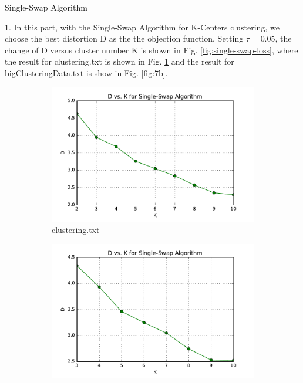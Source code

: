 \begin{description}
\begin{description}
\end{description}


\item[(\Romannum{3}).] Single-Swap Algorithm

\begin{description}
\item{1.} In this part, with the Single-Swap Algorithm for K-Centers clustering, we choose the best distortion D as the the objection function. Setting $\tau = 0.05$, the change of D versus cluster number K is shown in Fig. \ref{fig:single-swap-loss}, where the result for clustering.txt is shown in Fig. \ref{fig:7a} and the result for bigClusteringData.txt is show in Fig. \ref{fig:7b}.

\begin{figure}[H]
\centering
\centering
        \begin{subfigure}[b]{0.49\textwidth}
            \centering
            \includegraphics[width=\textwidth]{./figures/loss_clustering_singleSwap.pdf}
            \caption{clustering.txt}\label{fig:7a}
        \end{subfigure}
        \hfill
        \begin{subfigure}[b]{0.49\textwidth}  
            \centering 
            \includegraphics[width=\textwidth]{./figures/loss_bigClustering_singleSwap.pdf}

\end{subfigure}
\end{figure}
\end{description}
\end{description}
